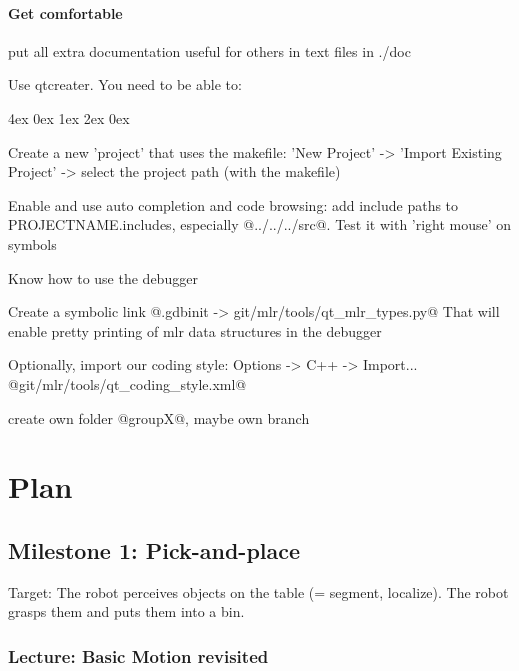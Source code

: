 \documentclass[10pt,fleqn,twoside]{article}
\newenvironment{items}[1][9]{
\par\setlength{\unitlength}{1pt}\fontsize{#1}{#1}\linespread{1.2}\selectfont
\begin{list}{--}{\leftmargin4ex \rightmargin0ex \labelsep1ex \labelwidth2ex
\topsep0pt \parsep0ex \itemsep3pt}
}{
\end{list}
}
\begin{document}
\paragraph{Get comfortable}
\begin{itemize}
\item put all extra documentation useful for others in text files in
  ./doc
\item Use qtcreater. You need to be able to:
\begin{items}
\item Create a new 'project' that uses the makefile: 'New Project' ->
  'Import Existing Project' -> select the project path (with the
  makefile)
\item Enable and use auto completion and code browsing: add include
  paths to PROJECTNAME.includes, especially @../../../src@. Test it
  with 'right mouse' on symbols
\item Know how to use the debugger
\item Create a symbolic link
  @.gdbinit -> git/mlr/tools/qt_mlr_types.py@
  That will enable pretty printing of mlr data structures in the
  debugger
\item Optionally, import our coding style: Options -> C++ ->
  Import... 
  @git/mlr/tools/qt_coding_style.xml@
\end{items}
\item create own folder @groupX@, maybe own branch
\end{itemize}



\section{Plan}

\subsection{Milestone 1: Pick-and-place}

Target: The robot perceives objects on the table (= segment,
localize). The robot grasps them and puts them into a bin.

\subsubsection{Lecture: Basic Motion revisited}
\end{document}
